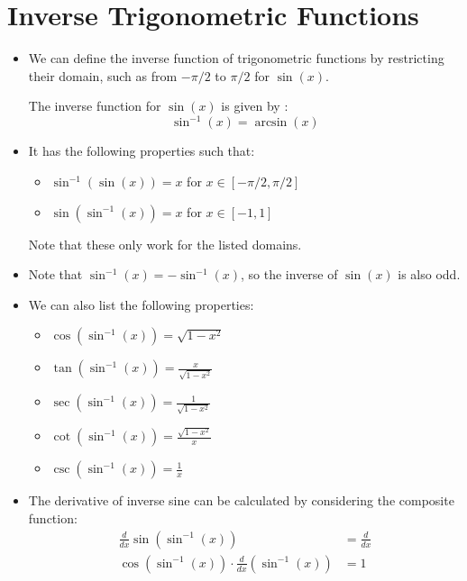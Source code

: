 \section{Inverse Trigonometric Functions}
\begin{itemize}
    \item We can define the inverse function of trigonometric functions by restricting their domain, such as from $-\pi/2$ to $\pi/2$ for $\sin(x)$.
    \begin{definition}
        The inverse function for $\sin(x)$ is given by :
        \begin{equation}
            \sin^{-1}(x) = \arcsin(x)
            \label{eq:}
        \end{equation}
    \end{definition}
    \item It has the following properties such that:
    \begin{itemize}
        \item $\sin^{-1}(\sin(x))=x$ for $x\in[-\pi/2,\pi/2]$
        \item $\sin(\sin^{-1}(x))=x$ for $x\in[-1,1]$
    \end{itemize}
    \begin{warning}
        Note that these only work for the listed domains.
    \end{warning}
    \item Note that $\sin^{-1}(x)=-\sin^{-1}(x)$, so the inverse of $\sin(x)$ is also odd.
    \item We can also list the following properties:
    \begin{itemize}
        \item $\cos(\sin^{-1}(x))=\sqrt{1-x^2}$
        \item $\tan(\sin^{-1}(x))=\frac{x}{\sqrt{1-x^2}}$
        \item $\sec(\sin^{-1}(x)) = \frac{1}{\sqrt{1-x^2}}$
        \item $\cot(\sin^{-1}(x)) = \frac{\sqrt{1-x^2}}{x}$
        \item $\csc(\sin^{-1}(x)) = \frac{1}{x}$ 
    \end{itemize}
    \item The derivative of inverse sine can be calculated by considering the composite function:
    \begin{align}
        \frac{d}{dx}\sin(\sin^{-1}(x)) &= \frac{d}{dx} \\ 
        \cos(\sin^{-1}(x)) \cdot \frac{d}{dx}(\sin^{-1}(x)) &= 1 \\

\end{align}
\end{itemize}
